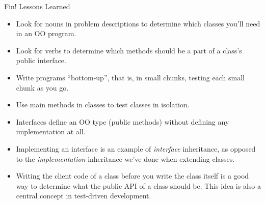 \documentclass{beamer}
\begin{document}
\begin{frame}[fragile]{Fin!  Lessons Learned}


\begin{itemize}
\item Look for nouns in problem descriptions to determine which classes you'll need in an OO program.
\item Look for verbs to determine which methods should be a part of a class's public interface.
\item Write programs ``bottom-up'', that is, in small chunks, testing each small chunk as you go.
\item Use main methods in classes to test classes in isolation.
\item Interfaces define an OO type (public methods) without defining any implementation at all.
\item Implementing an interface is an example of {\it interface} inheritance, as opposed to the {\it implementation} inheritance we've done when extending classes.
\item Writing the client code of a class before you write the class itself is a good way to determine what the public API of a class should be.  This idea is also a central concept in test-driven development.
\end{itemize}


\end{frame}









\end{document}
